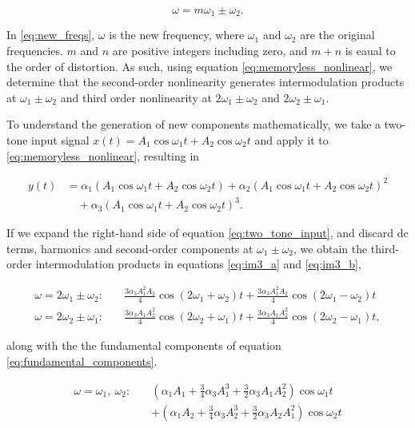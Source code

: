 \begin{equation}
  \omega = m\omega_1 \pm \omega_2.
  \label{eq:new_freqs}
\end{equation}

In \eqref{eq:new_freqs}, $\omega$ is the new frequency, where $\omega_1$ and $\omega_2$ are the original frequencies. $m$ and $n$ are positive integers including zero, and $m + n$ is eaual to the order of distortion. As such, using equation \eqref{eq:memoryless_nonlinear}, we determine that the second-order nonlinearity generates intermodulation products at $\omega_1 \pm \omega_2$ and third order nonlinearity at $2\omega_1 \pm \omega_2$ and $2\omega_2 \pm \omega_1$.

To understand the generation of new components mathematically, we take a two-tone input signal $x(t) = A_1\cos \omega_1 t + A_2\cos \omega_2 t$ and apply it to \eqref{eq:memoryless_nonlinear}, resulting in

\begin{equation}
\begin{split}
  y(t) &= \alpha_1(A_1\cos\omega_1 t + A_2\cos\omega_2 t)
          + \alpha_2(A_1\cos\omega_1 t + A_2\cos\omega_2 t)^2 \\
       &\quad + \alpha_3(A_1\cos\omega_1 t + A_2\cos\omega_2 t)^3 .
\end{split}
\label{eq:two_tone_input}
\end{equation}

If we expand the right-hand side of equation \eqref{eq:two_tone_input}, and discard dc terms, harmonics and second-order components at $\omega_1 \pm \omega_2$, we obtain the third-order intermodulation products in equations \eqref{eq:im3_a} and \eqref{eq:im3_b},

\begin{align}
  \omega = 2\omega_1 \pm \omega_2 :\quad
    &\frac{3\alpha_3 A_1^2 A_2}{4}\cos(2\omega_1+\omega_2)t
     + \frac{3\alpha_3 A_1^2 A_2}{4}\cos(2\omega_1-\omega_2)t
     \label{eq:im3_a} \\
  \omega = 2\omega_2 \pm \omega_1 :\quad
    &\frac{3\alpha_3 A_1 A_2^2}{4}\cos(2\omega_2+\omega_1)t
     + \frac{3\alpha_3 A_1 A_2^2}{4}\cos(2\omega_2-\omega_1)t
     \label{eq:im3_b},
\end{align}

along with the the fundamental components of equation \eqref{eq:fundamental_components}.

\begin{align}
  \omega = \omega_1,\ \omega_2 :\quad
    &\left(\alpha_1 A_1 + \frac{3}{4}\alpha_3 A_1^3
           + \frac{3}{2}\alpha_3 A_1 A_2^2\right)\cos\omega_1 t \nonumber \\
    &+ \left(\alpha_1 A_2 + \frac{3}{4}\alpha_3 A_2^3
           + \frac{3}{2}\alpha_3 A_2 A_1^2\right)\cos\omega_2 t
     \label{eq:fundamental_components}
\end{align}

